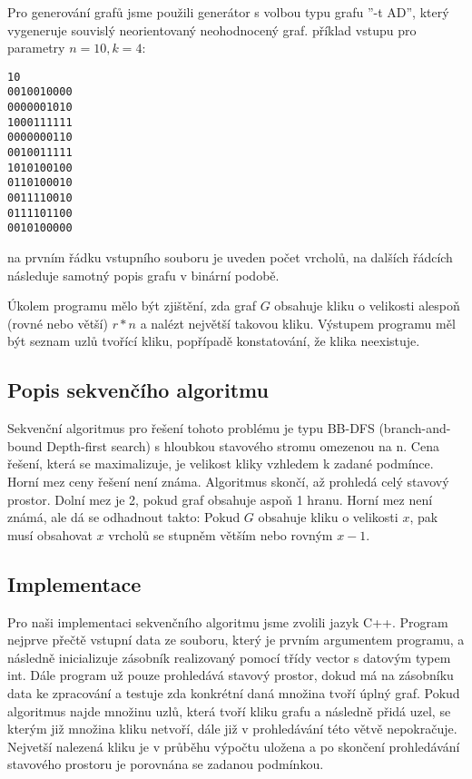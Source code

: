 \documentclass[12pt]{article}
\begin{document}
Pro generování grafů jsme použili generátor s volbou typu grafu ''-t AD'', 
který vygeneruje souvislý neorientovaný neohodnocený graf. příklad vstupu pro parametry $n = 10, k = 4$: 

\begin{lstlisting}
10
0010010000
0000001010
1000111111
0000000110
0010011111
1010100100
0110100010
0011110010
0111101100
0010100000
\end{lstlisting}

na prvním řádku vstupního souboru je uveden počet vrcholů, na dalších řádcích následuje samotný popis grafu v binární podobě.

Úkolem programu mělo být zjištění, zda graf $G$ obsahuje kliku o velikosti alespoň (rovné nebo větší) $r * n$ a nalézt největší takovou kliku. 
Výstupem programu měl být seznam uzlů tvořící kliku, popřípadě konstatování, že klika neexistuje. 


\subsection{Popis sekvenčího algoritmu}

Sekvenční algoritmus pro řešení tohoto problému je typu BB-DFS (branch-and-bound Depth-first search) 
s hloubkou stavového stromu omezenou na n. 
Cena řešení, která se maximalizuje, je velikost kliky vzhledem k zadané podmínce. 
Horní mez ceny řešení není známa. Algoritmus skončí, až prohledá celý stavový prostor.
Dolní mez je 2, pokud graf obsahuje aspoň 1 hranu.
Horní mez není známá, ale dá se odhadnout takto: Pokud $G$ obsahuje kliku o velikosti $x$, pak musí obsahovat $x$ vrcholů se stupněm větším nebo rovným $x-1$.

\subsection{Implementace}

Pro naši implementaci sekvenčního algoritmu jsme zvolili jazyk C++.
Program nejprve přečtě vstupní data ze souboru, který je prvním argumentem programu, a následně inicializuje zásobník 
realizovaný pomocí třídy vector s datovým typem int.
Dále program už pouze prohledává stavový prostor, dokud má na zásobníku data ke zpracování
a testuje zda konkrétní daná množina tvoří úplný graf. 
Pokud algoritmus najde množinu uzlů, která tvoří kliku grafu a následně přidá uzel, se kterým již množina kliku netvoří, dále již v prohledávání této větvě nepokračuje.
Nejvetší nalezená kliku je v průběhu výpočtu uložena a po skončení prohledávání stavového prostoru je porovnána se zadanou podmínkou.
\end{document}
